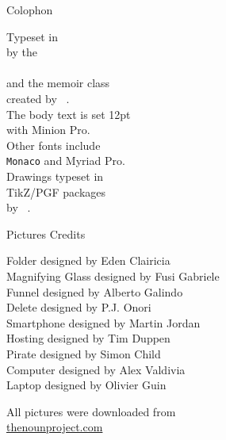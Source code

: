 \vspace*{8em}
      \begin{minipage}[t]{.55\textwidth}
      \begin{flushright}
            {\Large \textsf{Colophon}}

            \vspace*{1em}

            Typeset in \textsf{\XeTeX}\\
            by the \\
             \\
            and the \textsf{memoir} class\\
            created by ~.\\
            The body text is set 12pt\\
            with Minion Pro. \\
            Other fonts include\\
             \texttt{Monaco} and \textsf{Myriad Pro}.\\
            Drawings typeset in\\
            \textsf{TikZ/PGF} packages\\
            by ~.

            \vspace*{2em}

            {\sffamily Pictures Credits}

            \vspace*{.5em}

            \textsf{Folder} designed by Eden Clairicia\\
            \textsf{Magnifying Glass} designed by Fusi Gabriele\\
            \textsf{Funnel} designed by Alberto Galindo\\
            \textsf{Delete} designed by P.J. Onori\\
            \textsf{Smartphone} designed by Martin Jordan\\
            \textsf{Hosting} designed by Tim Duppen\\
            \textsf{Pirate} designed by Simon Child\\
            \textsf{Computer} designed by Alex Valdivia\\
            \textsf{Laptop} designed by Olivier Guin\\

            \vspace*{.7em}

            All pictures were downloaded from\\
            \url{thenounproject.com}
            \end{flushright}
      \end{minipage}%
